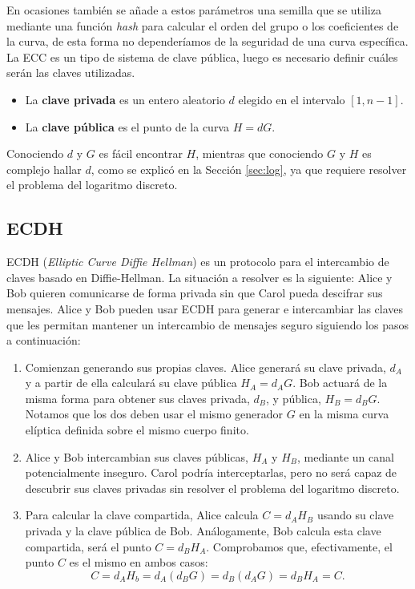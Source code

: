 \documentclass[11pt]{article}
\begin{document}
En ocasiones también se añade a estos parámetros una semilla que se utiliza mediante una función \textit{hash} para calcular el orden del grupo o los coeficientes de la curva, de esta forma no dependeríamos de la seguridad de una curva específica.\\

La ECC es un tipo de sistema de clave pública, luego es necesario definir cuáles serán las claves utilizadas.

\begin{itemize}
\item La \textbf{clave privada} es un entero aleatorio $d$ elegido en el intervalo $[1,n-1]$.
\item La \textbf{clave pública} es el punto de la curva $H = dG$.
\end{itemize}

Conociendo $d$ y $G$ es fácil encontrar $H$, mientras que conociendo $G$ y $H$ es complejo hallar $d$, como se explicó en la Sección \ref{sec:log}, ya que requiere resolver el problema del logaritmo discreto.


\subsection{ECDH}
ECDH (\textit{Elliptic Curve Diffie Hellman}) es un protocolo para el intercambio de claves basado en Diffie-Hellman. La situación a resolver es la siguiente: Alice y Bob quieren comunicarse de forma privada sin que Carol pueda descifrar sus mensajes. Alice y Bob pueden usar ECDH para generar e intercambiar las claves que les permitan mantener un intercambio de mensajes seguro siguiendo los pasos a continuación:

\begin{enumerate}
\item Comienzan generando sus propias claves. Alice generará su clave privada, $d_A$ y a partir de ella calculará su clave pública $H_A = d_AG$. Bob actuará de la misma forma para obtener sus claves privada, $d_B$, y pública, $H_B = d_BG$. Notamos que los dos deben usar el mismo generador $G$ en la misma curva elíptica definida sobre el mismo cuerpo finito.

\item Alice y Bob intercambian sus claves públicas, $H_A$ y $H_B$, mediante un canal potencialmente inseguro. Carol podría interceptarlas, pero no será capaz de descubrir sus claves privadas sin resolver el problema del logaritmo discreto.\\
\item Para calcular la clave compartida, Alice calcula $C = d_AH_B$ usando su clave privada y la clave pública de Bob. Análogamente, Bob calcula esta clave compartida, será el punto $C = d_BH_A$. Comprobamos que, efectivamente, el punto $C$ es el mismo en ambos casos:
  \[C = d_AH_b = d_A(d_BG) = d_B(d_AG) = d_BH_A = C.\]
\end{enumerate}
\end{document}
